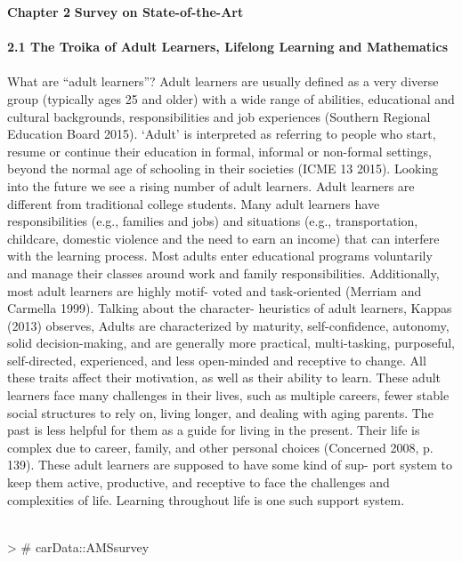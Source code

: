 \documentclass{article}
\begin{document}
\textbf{ Chapter 2 }
\textbf{ Survey on State-of-the-Art }
\textit{\\\\}
\textbf{  2.1 The Troika of Adult Learners, Lifelong Learning and Mathematics }
\textit{\\\\}
What are “adult learners”? Adult learners are usually defined as a very diverse
group (typically ages 25 and older) with a wide range of abilities, educational and
cultural backgrounds, responsibilities and job experiences (Southern Regional
Education Board 2015). ‘Adult’ is interpreted as referring to people who start,
resume or continue their education in formal, informal or non-formal settings,
beyond the normal age of schooling in their societies (ICME 13 2015). Looking
into the future we see a rising number of adult learners. Adult learners are different
from traditional college students. Many adult learners have responsibilities (e.g.,
families and jobs) and situations (e.g., transportation, childcare, domestic violence
                                                                                                and the need to earn an income) that can interfere with the learning process. Most
adults enter educational programs voluntarily and manage their classes around
work and family responsibilities. Additionally, most adult learners are highly motif-
voted and task-oriented (Merriam and Carmella 1999). Talking about the character-
heuristics of adult learners, Kappas (2013) observes,
Adults are characterized by maturity, self-confidence, autonomy, solid decision-making,
and are generally more practical, multi-tasking, purposeful, self-directed, experienced,
and less open-minded and receptive to change. All these traits affect their motivation, as
well as their ability to learn.
These adult learners face many challenges in their lives, such as multiple
careers, fewer stable social structures to rely on, living longer, and dealing with
aging parents. The past is less helpful for them as a guide for living in the present.
Their life is complex due to career, family, and other personal choices (Concerned
2008, p. 139). These adult learners are supposed to have some kind of sup-
port system to keep them active, productive, and receptive to face the challenges
and complexities of life. Learning throughout life is one such support system.
\textit{\\\\}
\begin{Schunk}
\begin{Sinput}
>    # carData::AMSsurvey
\end{Sinput}
\end{Schunk}
\end{document}
